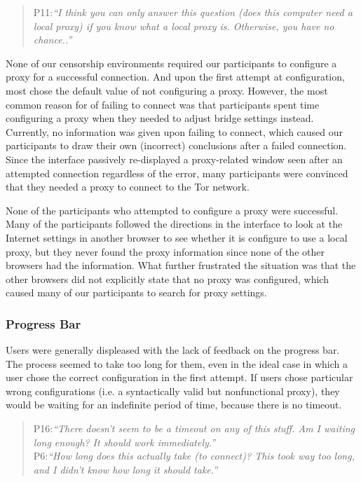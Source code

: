 \documentclass{template}
\begin{document}
\begin{quotation}
\noindent P11:\textit{``I think you can only answer this question (does this computer need a local proxy) if you know what a local proxy is. Otherwise, you have no chance..''}
\end{quotation}

None of our censorship environments required our participants to configure a proxy for a successful connection. And upon the first attempt at configuration, most chose the default value of not configuring a proxy.  However, the most common reason for of failing to connect was that participants spent time configuring a proxy when they needed to adjust  bridge settings instead. Currently, no information was given upon failing to connect, which caused our participants to draw their own (incorrect) conclusions after a failed connection. Since the interface passively re-displayed a proxy-related window seen after an attempted connection regardless of the error, many participants were convinced that they needed a proxy to connect to the Tor network.

None of the participants who attempted to configure a proxy were successful. Many of the participants followed the directions in the interface to look at the Internet settings in another browser to see whether it is configure to use a local proxy, but they never found the proxy information since none of the other browsers had the information. What further frustrated the situation was that the other browsers did not explicitly state that no proxy was configured, which caused many of our participants to search for proxy settings.\\

\subsubsection{Progress Bar} 
Users were generally displeased with the lack of feedback on the progress bar. The process seemed to take too long for them, even in the ideal case in which a user chose the correct configuration in the first attempt. If users chose particular wrong configurations (i.e. a syntactically valid but nonfunctional proxy), they would be waiting for an indefinite period of time, because there is no timeout. 

\begin{quotation}
\noindent P16:\textit{``There doesn't seem to be a timeout on any of this stuff. Am I waiting long enough? It should work immediately.''}\\

\noindent P6:\textit{``How long does this actually take (to connect)? This took way too long, and I didn't know how long it should take.''}
\end{quotation}
\end{document}
